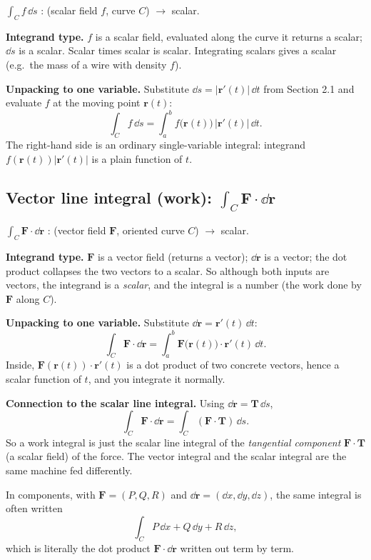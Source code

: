 \documentclass{essay}
\newcommand{\F}{\mathbf{F}}
\newcommand{\rr}{\mathbf{r}}
\newcommand{\TT}{\mathbf{T}}
\begin{document}
\begin{signature}
  $\displaystyle \int_C f\,\dd s$ \;:\; (scalar field $f$, curve $C$) $\to$ scalar.
\end{signature}

\textbf{Integrand type.} $f$ is a scalar field, evaluated along the curve it returns
a scalar; $\dd s$ is a scalar. Scalar times scalar is scalar. Integrating scalars
gives a scalar (e.g.\ the mass of a wire with density $f$).

\textbf{Unpacking to one variable.} Substitute $\dd s = \lvert\rr'(t)\rvert\,\dd t$
from Section 2.1 and evaluate $f$ at the moving point $\rr(t)$:
\[
  \int_C f\,\dd s = \int_a^b f\bigl(\rr(t)\bigr)\,\lvert\rr'(t)\rvert\,\dd t .
\]
The right-hand side is an ordinary single-variable integral: integrand
$f(\rr(t))\lvert\rr'(t)\rvert$ is a plain function of $t$.

\subsection{Vector line integral (work): $\int_C \F\cdot\dd\mathbf{r}$}

\begin{signature}
  $\displaystyle \int_C \F\cdot\dd\mathbf{r}$ \;:\; (vector field $\F$, oriented curve
  $C$) $\to$ scalar.
\end{signature}

\textbf{Integrand type.} $\F$ is a vector field (returns a vector); $\dd\mathbf{r}$ is
a vector; the dot product collapses the two vectors to a scalar. So although both
inputs are vectors, the integrand is a \emph{scalar}, and the integral is a number
(the work done by $\F$ along $C$).

\textbf{Unpacking to one variable.} Substitute $\dd\mathbf{r}=\rr'(t)\,\dd t$:
\[
  \int_C \F\cdot\dd\mathbf{r}
  = \int_a^b \F\bigl(\rr(t)\bigr)\cdot\rr'(t)\,\dd t .
\]
Inside, $\F(\rr(t))\cdot\rr'(t)$ is a dot product of two concrete vectors, hence a
scalar function of $t$, and you integrate it normally.

\textbf{Connection to the scalar line integral.} Using $\dd\mathbf{r}=\TT\,\dd s$,
\[
  \int_C \F\cdot\dd\mathbf{r} = \int_C (\F\cdot\TT)\,\dd s .
\]
So a work integral is just the scalar line integral of the \emph{tangential
component} $\F\cdot\TT$ (a scalar field) of the force. The vector integral and the
scalar integral are the same machine fed differently.

In components, with $\F=(P,Q,R)$ and $\dd\mathbf{r}=(\dd x,\dd y,\dd z)$, the same
integral is often written
\[
  \int_C P\,\dd x + Q\,\dd y + R\,\dd z,
\]
which is literally the dot product $\F\cdot\dd\mathbf{r}$ written out term by term.
\end{document}
